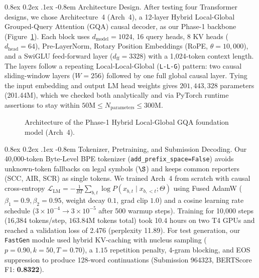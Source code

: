 \documentclass[11pt, oneside]{article}
\makeatletter
\renewcommand\paragraph{\@startsection{paragraph}{4}{\z@}%
  {0.8ex \@plus0.2ex \@minus.1ex}%
  {-0.8em}%
  {\normalfont\normalsize\bfseries}}
\makeatother
\begin{document}
\paragraph{Architecture Design.}
After testing four Transformer designs, we chose Architecture~4 (Arch~4), a 12-layer Hybrid Local-Global Grouped-Query Attention (GQA) causal decoder, as our Phase-1 backbone (Figure~\ref{fig:phase1_arch4}). Each block uses $d_{\mathrm{model}}=1024$, 16 query heads, 8 KV heads ($d_{\mathrm{head}}=64$), Pre-LayerNorm, Rotary Position Embeddings (RoPE, $\theta=10,000$), and a SwiGLU feed-forward layer ($d_{\mathrm{ff}}=3328$) with a 1,024-token context length. The layers follow a repeating Local-Local-Global (\texttt{L-L-G}) pattern: two causal sliding-window layers ($W=256$) followed by one full global causal layer. Tying the input embedding and output LM head weights gives $201,443,328$ parameters (201.44M), which we checked both analytically and via PyTorch runtime assertions to stay within $50\text{M}\leq N_{\mathrm{parameters}}\leq300\text{M}$.

\begin{figure}[t]
\centering
\scriptsize
{}
\caption{Architecture of the Phase-1 Hybrid Local-Global GQA foundation model (Arch~4).}
\label{fig:phase1_arch4}
\end{figure}

\paragraph{Tokenizer, Pretraining, and Submission Decoding.}
Our 40,000-token Byte-Level BPE tokenizer (\texttt{add\_prefix\_space=False}) avoids unknown-token fallbacks on legal symbols ($\S$) and keeps common reporters (SCC, AIR, SCR) as single tokens. We trained Arch~4 from scratch with causal cross-entropy $\mathcal{L}_{\mathrm{LM}} = -\frac{1}{BT}\sum_{b,t}\log P(x_{b,t}\mid x_{b,<t};\Theta)$ using Fused AdamW ($\beta_1=0.9, \beta_2=0.95$, weight decay $0.1$, grad clip $1.0$) and a cosine learning rate schedule ($3\times10^{-4}\to 3\times10^{-5}$ after 500 warmup steps). Training for 10,000 steps (16,384 tokens/step, $163.84\text{M}$ tokens total) took 10.4 hours on two T4 GPUs and reached a validation loss of 2.476 (perplexity 11.89). For test generation, our \texttt{FastGen} module used hybrid KV-caching with nucleus sampling ($p=0.90, k=50, T=0.70$), a $1.15$ repetition penalty, 4-gram blocking, and EOS suppression to produce 128-word continuations (Submission 964323, BERTScore F1: \textbf{0.8322}).
\end{document}
